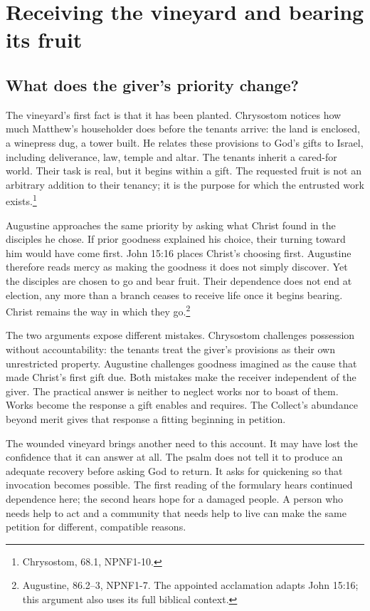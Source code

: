 \clearpage
\section{Receiving the vineyard and bearing its fruit}
\subsection{What does the giver's priority change?}
The vineyard's first fact is that it has been planted. Chrysostom notices how much Matthew's householder does before the tenants arrive: the land is enclosed, a winepress dug, a tower built. He relates these provisions to God's gifts to Israel, including deliverance, law, temple and altar. The tenants inherit a cared-for world. Their task is real, but it begins within a gift. The requested fruit is not an arbitrary addition to their tenancy; it is the purpose for which the entrusted work exists.\footnote{Chrysostom,  68.1, NPNF1-10.}

Augustine approaches the same priority by asking what Christ found in the disciples he chose. If prior goodness explained his choice, their turning toward him would have come first. John 15:16 places Christ's choosing first. Augustine therefore reads mercy as making the goodness it does not simply discover. Yet the disciples are chosen to go and bear fruit. Their dependence does not end at election, any more than a branch ceases to receive life once it begins bearing. Christ remains the way in which they go.\footnote{Augustine,  86.2--3, NPNF1-7. The appointed acclamation adapts John 15:16; this argument also uses its full biblical context.}

The two arguments expose different mistakes. Chrysostom challenges possession without accountability: the tenants treat the giver's provisions as their own unrestricted property. Augustine challenges goodness imagined as the cause that made Christ's first gift due. Both mistakes make the receiver independent of the giver. The practical answer is neither to neglect works nor to boast of them. Works become the response a gift enables and requires. The Collect's abundance beyond merit gives that response a fitting beginning in petition.

The wounded vineyard brings another need to this account. It may have lost the confidence that it can answer at all. The psalm does not tell it to produce an adequate recovery before asking God to return. It asks for quickening so that invocation becomes possible. The first reading of the formulary hears continued dependence here; the second hears hope for a damaged people. A person who needs help to act and a community that needs help to live can make the same petition for different, compatible reasons.


